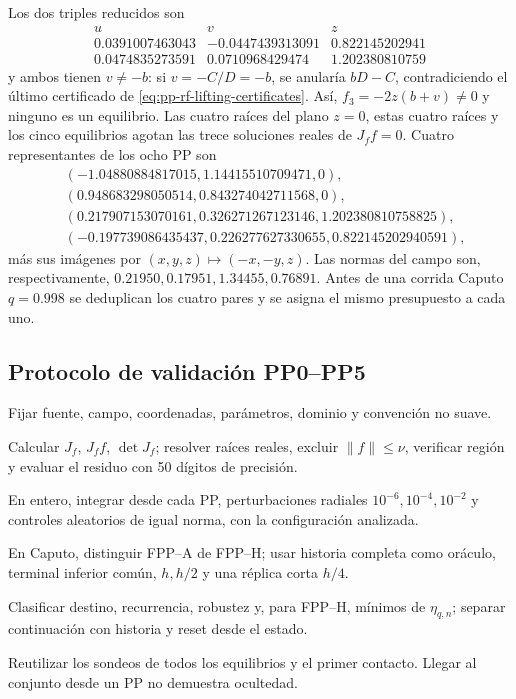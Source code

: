 Los dos triples reducidos son
\[
 \begin{array}{c|rr}
 u&v&z\\\hline
 0.0391007463043&-0.0447439313091&0.822145202941\\
 0.0474835273591& 0.0710968429474&1.202380810759
 \end{array}
\]
y ambos tienen \(v\ne-b\): si \(v=-C/D=-b\), se anularía
\(bD-C\), contradiciendo el último certificado de
\cref{eq:pp-rf-lifting-certificates}. Así,
\(f_3=-2z(b+v)\ne0\) y ninguno es un equilibrio.
Las cuatro raíces del plano \(z=0\), estas cuatro raíces y los cinco
equilibrios agotan las trece soluciones reales de \(J_ff=0\). Cuatro
representantes de los ocho PP son
\begin{align}
 &( -1.04880884817015, 1.14415510709471, 0),\\
 &( 0.948683298050514, 0.843274042711568, 0),\\
 &( 0.217907153070161, 0.326271267123146, 1.202380810758825),\\
 &( -0.197739086435437, 0.226277627330655, 0.822145202940591),
\end{align}
más sus imágenes por \((x,y,z)\mapsto(-x,-y,z)\). Las normas del campo son,
respectivamente, \(0.21950,0.17951,1.34455,0.76891\). Antes de una corrida
Caputo \(q=0.998\) se deduplican los cuatro pares y se asigna el mismo
presupuesto a cada uno.

\subsection{Protocolo de validación PP0--PP5}

\begin{description}[style=nextline,leftmargin=3.2em,labelwidth=2.7em]
 \item[PP0] Fijar fuente, campo, coordenadas, parámetros, dominio y
 convención no suave.
 \item[PP1] Calcular \(J_f\), \(J_f f\), \(\det J_f\); resolver raíces reales,
 excluir \(\|f\|\leq\nu\), verificar región y evaluar el residuo con
 50 dígitos de precisión.
 \item[PP2] En entero, integrar desde cada PP, perturbaciones radiales
 \(10^{-6},10^{-4},10^{-2}\) y controles aleatorios de igual norma, con la
 configuración analizada.
 \item[PP3] En Caputo, distinguir FPP--A de FPP--H; usar historia completa como
 oráculo, terminal inferior común, \(h,h/2\) y una réplica corta \(h/4\).
 \item[PP4] Clasificar destino, recurrencia, robustez y, para FPP--H, mínimos de
 \(\eta_{q,n}\); separar continuación con historia y reset desde el estado.
 \item[PP5] Reutilizar los sondeos de todos los equilibrios y el primer
 contacto. Llegar al conjunto desde un PP no demuestra ocultedad.
\end{description}

